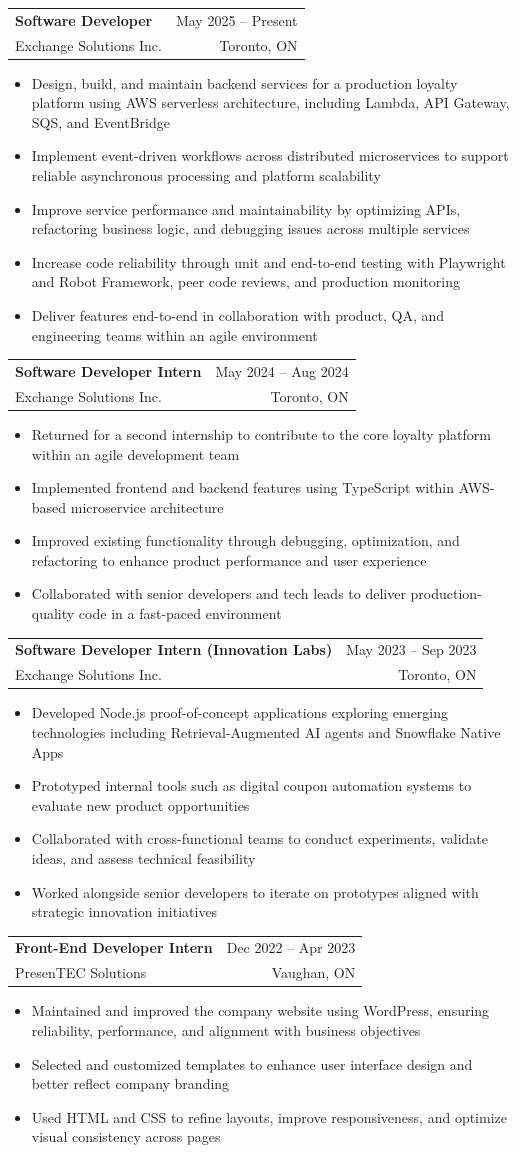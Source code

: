 \documentclass[letterpaper,11pt]{article}
\makeatletter
\newcommand{\resumeItem}[1]{
  \item\small{
    {#1 \vspace{-2pt}}
  }
}
\newcommand{\resumeSubheading}[4]{
  \vspace{-2pt}\item
    \begin{tabular*}{0.97\textwidth}[t]{l@{\extracolsep{\fill}}r}
      \textbf{#1} & #2 \\
      \small#3 & \small #4 \\
    \end{tabular*}\vspace{-7pt}
}
\newcommand{\resumeItemListStart}{\begin{itemize}}
\newcommand{\resumeItemListEnd}{\end{itemize}\vspace{-5pt}}
\makeatother
\begin{document}
    \resumeSubheading
      {Software Developer}{May 2025 -- Present}
      {Exchange Solutions Inc.}{Toronto, ON}
      \resumeItemListStart
      \resumeItem{Design, build, and maintain backend services for a production loyalty platform using AWS serverless architecture, including Lambda, API Gateway, SQS, and EventBridge}
      \resumeItem{Implement event-driven workflows across distributed microservices to support reliable asynchronous processing and platform scalability}
      \resumeItem{Improve service performance and maintainability by optimizing APIs, refactoring business logic, and debugging issues across multiple services}
      \resumeItem{Increase code reliability through unit and end-to-end testing with Playwright and Robot Framework, peer code reviews, and production monitoring}
      \resumeItem{Deliver features end-to-end in collaboration with product, QA, and engineering teams within an agile environment}
      \resumeItemListEnd

    \resumeSubheading
      {Software Developer Intern}{May 2024 -- Aug 2024}
      {Exchange Solutions Inc.}{Toronto, ON}
      \resumeItemListStart
        \resumeItem{Returned for a second internship to contribute to the core loyalty platform within an agile development team}
        \resumeItem{Implemented frontend and backend features using TypeScript within AWS-based microservice architecture}
        \resumeItem{Improved existing functionality through debugging, optimization, and refactoring to enhance product performance and user experience}
        \resumeItem{Collaborated with senior developers and tech leads to deliver production-quality code in a fast-paced environment}
      \resumeItemListEnd

    \resumeSubheading
      {Software Developer Intern (Innovation Labs)}{May 2023 -- Sep 2023}
      {Exchange Solutions Inc.}{Toronto, ON}
      \resumeItemListStart
        \resumeItem{Developed Node.js proof-of-concept applications exploring emerging technologies including Retrieval-Augmented AI agents and Snowflake Native Apps}
        \resumeItem{Prototyped internal tools such as digital coupon automation systems to evaluate new product opportunities}
        \resumeItem{Collaborated with cross-functional teams to conduct experiments, validate ideas, and assess technical feasibility}
        \resumeItem{Worked alongside senior developers to iterate on prototypes aligned with strategic innovation initiatives}
      \resumeItemListEnd

    \resumeSubheading
      {Front-End Developer Intern}{Dec 2022 -- Apr 2023}
      {PresenTEC Solutions}{Vaughan, ON}
      \resumeItemListStart
        \resumeItem{Maintained and improved the company website using WordPress, ensuring reliability, performance, and alignment with business objectives}
        \resumeItem{Selected and customized templates to enhance user interface design and better reflect company branding}
        \resumeItem{Used HTML and CSS to refine layouts, improve responsiveness, and optimize visual consistency across pages}
      \resumeItemListEnd
\end{document}
